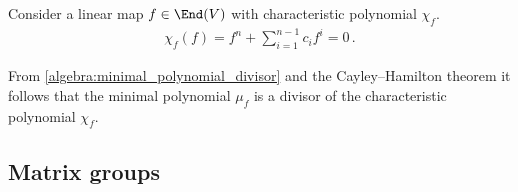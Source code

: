     \begin{theorem}\label{linalgebra:cayley_hamilton}
        Consider a linear map $f\in\End(V)$ with characteristic polynomial $\chi_f$.
        \begin{gather}
            \chi_f(f) = f^n + \sum_{i=1}^{n-1}c_if^i=0\,.
        \end{gather}
    \end{theorem}
    \begin{result}
        From \cref{algebra:minimal_polynomial_divisor} and the Cayley--Hamilton theorem it follows that the minimal polynomial $\mu_f$ is a divisor of the characteristic polynomial $\chi_f$.
    \end{result}

\subsection{Matrix groups}\label{section:linear_groups}

